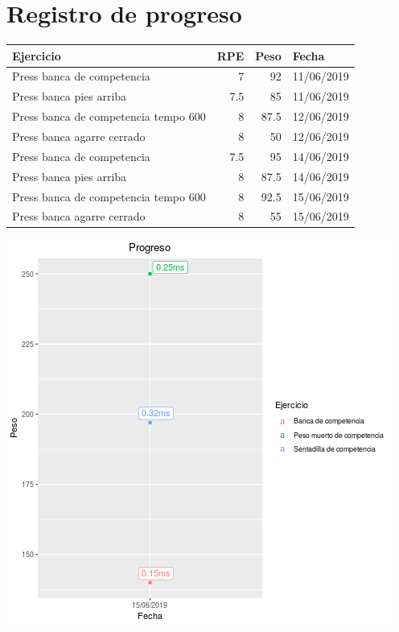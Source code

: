 \documentclass[11pt]{article}
\begin{document}
\section{Registro de progreso}
\label{sec:org1d6b782}
\begin{center}
\label{tab:orgb24dcd4}
\begin{tabular}{lrrl}
Ejercicio & RPE & Peso & Fecha\\
\hline
Press banca de competencia & 7 & 92 & 11/06/2019\\
Press banca pies arriba & 7.5 & 85 & 11/06/2019\\
Press banca de competencia tempo 600 & 8 & 87.5 & 12/06/2019\\
Press banca agarre cerrado & 8 & 50 & 12/06/2019\\
Press banca de competencia & 7.5 & 95 & 14/06/2019\\
Press banca pies arriba & 8 & 87.5 & 14/06/2019\\
Press banca de competencia tempo 600 & 8 & 92.5 & 15/06/2019\\
Press banca agarre cerrado & 8 & 55 & 15/06/2019\\
\end{tabular}
\end{center}
\begin{center}
\includegraphics[width=.9\linewidth]{tmp.png}
\end{center}
\end{document}
